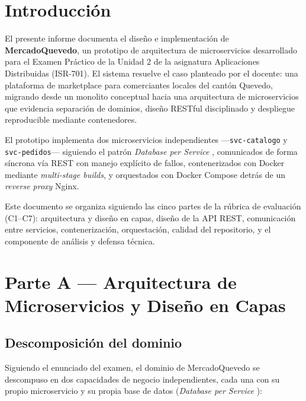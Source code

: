 \documentclass[11pt,a4paper]{article}
\begin{document}
\tableofcontents
\newpage

\section{Introducción}

El presente informe documenta el diseño e implementación de \textbf{MercadoQuevedo},
un prototipo de arquitectura de microservicios desarrollado para el Examen
Práctico de la Unidad 2 de la asignatura Aplicaciones Distribuidas (ISR-701).
El sistema resuelve el caso planteado por el docente: una plataforma de
marketplace para comerciantes locales del cantón Quevedo, migrando desde un
monolito conceptual hacia una arquitectura de microservicios que evidencia
separación de dominios, diseño RESTful disciplinado y despliegue reproducible
mediante contenedores.

El prototipo implementa dos microservicios independientes —\texttt{svc-catalogo}
y \texttt{svc-pedidos}— siguiendo el patrón \emph{Database per Service}
\cite{richardson2018}, comunicados de forma síncrona vía REST con manejo
explícito de fallos, contenerizados con Docker mediante \emph{multi-stage
builds}, y orquestados con Docker Compose detrás de un \emph{reverse proxy}
Nginx.

Este documento se organiza siguiendo las cinco partes de la rúbrica de
evaluación (C1--C7): arquitectura y diseño en capas, diseño de la API REST,
comunicación entre servicios, contenerización, orquestación, calidad del
repositorio, y el componente de análisis y defensa técnica.

\section{Parte A — Arquitectura de Microservicios y Diseño en Capas}

\subsection{Descomposición del dominio}

Siguiendo el enunciado del examen, el dominio de MercadoQuevedo se descompuso
en dos capacidades de negocio independientes, cada una con su propio
microservicio y su propia base de datos (\emph{Database per Service}
\cite{richardson2018}):
\end{document}
